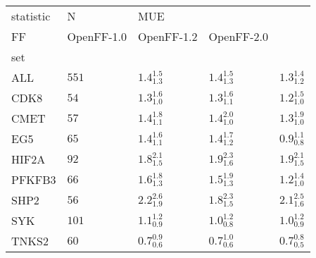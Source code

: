 \begin{tabular}{lllll}
\toprule
statistic &      N & \multicolumn{3}{l}{MUE} \\
FF &         OpenFF-1.0 &         OpenFF-1.2 &         OpenFF-2.0 \\
set    &        &                    &                    &                    \\
\midrule
ALL    &  $551$ &  $1.4_{1.3}^{1.5}$ &  $1.4_{1.3}^{1.5}$ &  $1.3_{1.2}^{1.4}$ \\
CDK8   &   $54$ &  $1.3_{1.0}^{1.6}$ &  $1.3_{1.1}^{1.6}$ &  $1.2_{1.0}^{1.5}$ \\
CMET   &   $57$ &  $1.4_{1.1}^{1.8}$ &  $1.4_{1.0}^{2.0}$ &  $1.3_{1.0}^{1.9}$ \\
EG5    &   $65$ &  $1.4_{1.1}^{1.6}$ &  $1.4_{1.2}^{1.7}$ &  $0.9_{0.8}^{1.1}$ \\
HIF2A  &   $92$ &  $1.8_{1.5}^{2.1}$ &  $1.9_{1.6}^{2.3}$ &  $1.9_{1.5}^{2.1}$ \\
PFKFB3 &   $66$ &  $1.6_{1.3}^{1.8}$ &  $1.5_{1.3}^{1.9}$ &  $1.2_{1.0}^{1.4}$ \\
SHP2   &   $56$ &  $2.2_{1.9}^{2.6}$ &  $1.8_{1.5}^{2.3}$ &  $2.1_{1.6}^{2.5}$ \\
SYK    &  $101$ &  $1.1_{0.9}^{1.2}$ &  $1.0_{0.8}^{1.2}$ &  $1.0_{0.9}^{1.2}$ \\
TNKS2  &   $60$ &  $0.7_{0.6}^{0.9}$ &  $0.7_{0.6}^{1.0}$ &  $0.7_{0.5}^{0.8}$ \\
\bottomrule
\end{tabular}
